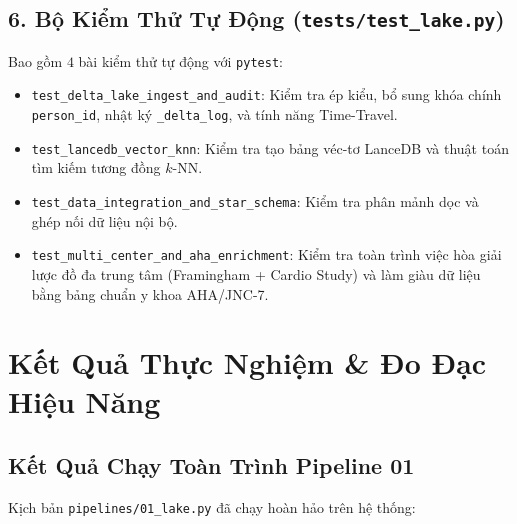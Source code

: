\documentclass[11pt,a4paper]{article}
\begin{document}
\subsection{6. Bộ Kiểm Thử Tự Động (\texttt{tests/test_lake.py})}
Bao gồm $4$ bài kiểm thử tự động với \texttt{pytest}:
\begin{itemize}
    \item \texttt{test_delta_lake_ingest_and_audit}: Kiểm tra ép kiểu, bổ sung khóa chính \texttt{person_id}, nhật ký \texttt{\_delta\_log}, và tính năng Time-Travel.
    \item \texttt{test_lancedb_vector_knn}: Kiểm tra tạo bảng véc-tơ LanceDB và thuật toán tìm kiếm tương đồng $k$-NN.
    \item \texttt{test_data_integration_and_star_schema}: Kiểm tra phân mảnh dọc và ghép nối dữ liệu nội bộ.
    \item \texttt{test_multi_center_and_aha_enrichment}: Kiểm tra toàn trình việc hòa giải lược đồ đa trung tâm (Framingham + Cardio Study) và làm giàu dữ liệu bằng bảng chuẩn y khoa AHA/JNC-7.
\end{itemize}

\section{Kết Quả Thực Nghiệm \& Đo Đạc Hiệu Năng}

\subsection{Kết Quả Chạy Toàn Trình Pipeline 01}
Kịch bản \texttt{pipelines/01_lake.py} đã chạy hoàn hảo trên hệ thống:
\end{document}
